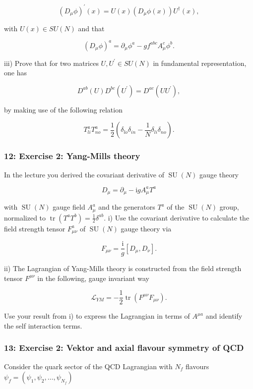 \documentclass[10pt, letterpaper]{article}
\begin{document}
$$
\left(D_\mu \phi\right)^{\prime}(x)=U(x)\left(D_\mu \phi(x)\right) U^{\dagger}(x),
$$

with $U(x) \in S U(N)$ and that

$$
\left(D_\mu \phi\right)^a=\partial_\mu \phi^a-g f^{a b c} A_\mu^c \phi^b .
$$

iii) Prove that for two matrices $U, U^{\prime} \in S U(N)$ in fundamental representation, one has

$$
D^{a b}(U) D^{b c}\left(U^{\prime}\right)=D^{a c}\left(U U^{\prime}\right),
$$

by making use of the following relation

$$
T_{l i}^a T_{n o}^a=\frac{1}{2}\left(\delta_{l o} \delta_{i n}-\frac{1}{N} \delta_{l i} \delta_{n o}\right) .
$$


\subsubsection{12: Exercise 2: Yang-Mills theory}
In the lecture you derived the covariant derivative of $\operatorname{SU}(N)$ gauge theory

$$
D_\mu=\partial_\mu-\mathrm{i} g A_\mu^a T^a
$$

with $\operatorname{SU}(N)$ gauge field $A_\mu^a$ and the generators $T^a$ of the $\operatorname{SU}(N)$ group, normalized to $\operatorname{tr}\left(T^a T^b\right)= \frac{1}{2} \delta^{a b}$.
i) Use the covariant derivative to calculate the field strength tensor $F_{\mu \nu}^a$ of $\operatorname{SU}(N)$ gauge theory via

$$
F_{\mu \nu}=\frac{\mathrm{i}}{g}\left[D_\mu, D_\nu\right] .
$$

ii) The Lagrangian of Yang-Mills theory is constructed from the field strength tensor $F^{\mu \nu}$ in the following, gauge invariant way

$$
\mathcal{L}_{Y M}=-\frac{1}{2} \operatorname{tr}\left(F^{\mu \nu} F_{\mu \nu}\right) .
$$


Use your result from i) to express the Lagrangian in terms of $A^{\mu a}$ and identify the self interaction terms.


\subsubsection{13: Exercise 2: Vektor and axial flavour symmetry of QCD}

Consider the quark sector of the QCD Lagrangian with $N_f$ flavours $\psi_f=\left(\psi_1, \psi_2, \ldots, \psi_{N_f}\right)$
\end{document}
